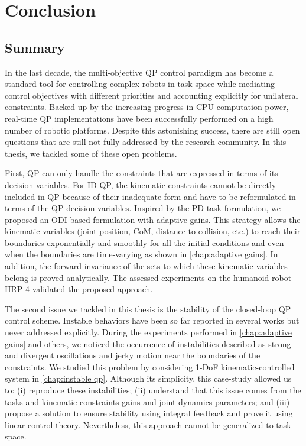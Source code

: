 \chapter{Conclusion} \label{chap:conclusion}
\section*{Summary}
In the last decade, the multi-objective QP control paradigm has become a standard tool for controlling complex robots in task-space while mediating control objectives with different priorities and accounting explicitly for unilateral constraints. Backed up by the increasing progress in CPU computation power, real-time QP implementations have been successfully performed on a high number of robotic platforms. Despite this astonishing success, there are still open questions that are still not fully addressed by the research community. 
In this thesis, we tackled some of these open problems. 

First, QP can only handle the constraints that are expressed in terms of its decision variables. For ID-QP, the kinematic constraints cannot be directly included in QP because of their inadequate form and have to be reformulated in terms of the QP decision variables. Inspired by the PD task formulation, we proposed an ODI-based formulation with adaptive gains. This strategy allows the kinematic variables (joint position, CoM, distance to collision, etc.) to reach their boundaries exponentially and smoothly for all the initial conditions and even when the boundaries are time-varying as shown in \cref{chap:adaptive gains}. In addition, the forward invariance of the sets to which these kinematic variables belong is proved analytically. The assessed experiments on the humanoid robot HRP-4 validated the proposed approach.

The second issue we tackled in this thesis is the stability of the closed-loop QP control scheme. Instable behaviors have been so far reported in several works but never addressed explicitly. During the experiments performed in \cref{chap:adaptive gains} and others, we noticed the occurrence of instabilities described as strong and divergent oscillations and jerky motion near the boundaries of the constraints. We studied this problem by considering 1-DoF kinematic-controlled system in \cref{chap:instable qp}. Although its simplicity, this case-study allowed us to: (i) reproduce these instabilities; (ii) understand that this issue comes from the tasks and kinematic constraints gains and joint-dynamics parameters; and (iii) propose a solution to ensure stability using integral feedback and prove it using linear control theory. Nevertheless, this approach cannot be generalized to task-space. 

